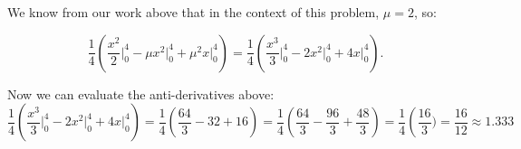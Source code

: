 \documentclass[a4paper,11pt]{article}
\begin{document}
We know from our work above that in the context of this problem, $\mu=2$, so:


\begin{equation}
  \frac{1}{4} \left( \frac{x^2}{2} \bigg\rvert_0^4 - \mu x^2 \bigg\rvert_0^4
    + \mu^2 x \bigg\rvert_0^4 \right) =
    \frac{1}{4} \left( \frac{x^3}{3} \bigg\rvert_0^4 - 2 x^2 \bigg\rvert_0^4
    + 4 x \bigg\rvert_0^4 \right).
\end{equation}

Now we can evaluate the anti-derivatives above:
\begin{equation}
    \frac{1}{4} \left( \frac{x^3}{3} \bigg\rvert_0^4 - 2 x^2 \bigg\rvert_0^4
    + 4 x \bigg\rvert_0^4 \right) =
    \frac{1}{4} \left( \frac{64}{3} - 32 + 16 \right)
    = \frac{1}{4} \left( \frac{64}{3} - \frac{96}{3} + \frac{48}{3} \right)
    = \frac{1}{4} \left(\frac{16}{3})
    =\frac{16}{12} \approx 1.333
\end{equation}


\printbibliography{}
\end{document}
